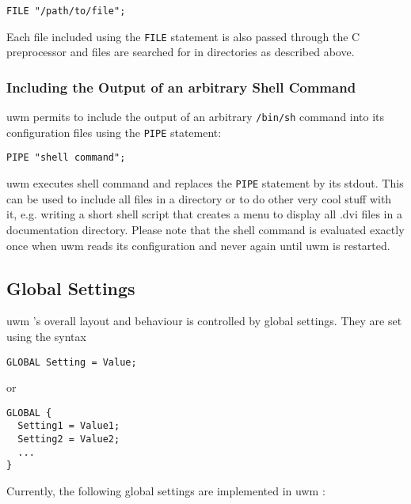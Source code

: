 \documentclass[10pt,a4paper]{article}
\newcommand{\uwm}{{\sc uwm} }
\begin{document}
\begin{verbatim}
FILE "/path/to/file";
\end{verbatim}

Each file included using the \texttt{FILE} statement is also passed through
the C preprocessor and files are searched for in directories as described
above.

\subsubsection{Including the Output of an arbitrary Shell Command}
\uwm permits to include the output of an arbitrary \texttt{/bin/sh}
command into its configuration files using the \texttt{PIPE} statement:

\begin{verbatim}
PIPE "shell command";
\end{verbatim}

\uwm executes shell command and replaces the \texttt{PIPE} statement by its
stdout. This can be used to include all files in a directory or to do other
very cool stuff with it, e.g. writing a short shell script that creates a menu
to display all .dvi files in a documentation directory. Please note that the
shell command is evaluated exactly once when uwm reads its configuration and
never again until uwm is restarted.

\subsection{Global Settings}

\uwm's overall layout and behaviour is controlled by global settings. They are
set using the syntax

\begin{verbatim}
GLOBAL Setting = Value;
\end{verbatim}

or

\begin{verbatim}
GLOBAL {
  Setting1 = Value1;
  Setting2 = Value2;
  ...
}
\end{verbatim}

Currently, the following global settings are implemented in \uwm:
\end{document}

